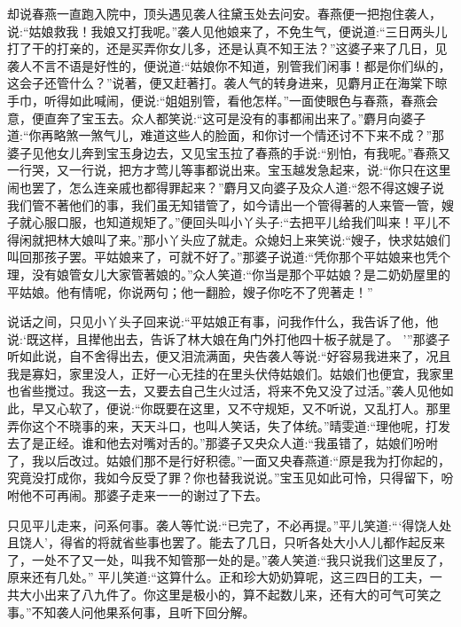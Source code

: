\begin{parag}
    却说春燕一直跑入院中，顶头遇见袭人往黛玉处去问安。春燕便一把抱住袭人，说:“姑娘救我！我娘又打我呢。”袭人见他娘来了，不免生气，便说道:“三日两头儿打了干的打亲的，还是买弄你女儿多，还是认真不知王法？”这婆子来了几日，见袭人不言不语是好性的，便说道:“姑娘你不知道，别管我们闲事！都是你们纵的，这会子还管什么？”说著，便又赶著打。袭人气的转身进来，见麝月正在海棠下晾手巾，听得如此喊闹，便说:“姐姐别管，看他怎样。”一面使眼色与春燕，春燕会意，便直奔了宝玉去。众人都笑说:“这可是没有的事都闹出来了。”麝月向婆子道:“你再略煞一煞气儿，难道这些人的脸面，和你讨一个情还讨不下来不成？”那婆子见他女儿奔到宝玉身边去，又见宝玉拉了春燕的手说:“别怕，有我呢。”春燕又一行哭，又一行说，把方才莺儿等事都说出来。宝玉越发急起来，说:“你只在这里闹也罢了，怎么连亲戚也都得罪起来？”麝月又向婆子及众人道:“怨不得这嫂子说我们管不著他们的事，我们虽无知错管了，如今请出一个管得著的人来管一管，嫂子就心服口服，也知道规矩了。”便回头叫小丫头子:“去把平儿给我们叫来！平儿不得闲就把林大娘叫了来。”那小丫头应了就走。众媳妇上来笑说:“嫂子，快求姑娘们叫回那孩子罢。平姑娘来了，可就不好了。”那婆子说道:“凭你那个平姑娘来也凭个理，没有娘管女儿大家管著娘的。”众人笑道:“你当是那个平姑娘？是二奶奶屋里的平姑娘。他有情呢，你说两句；他一翻脸，嫂子你吃不了兜著走！”
\end{parag}


\begin{parag}
    说话之间，只见小丫头子回来说:“平姑娘正有事，问我作什么，我告诉了他，他说:‘既这样，且撵他出去，告诉了林大娘在角门外打他四十板子就是了。 ’”那婆子听如此说，自不舍得出去，便又泪流满面，央告袭人等说:“好容易我进来了，况且我是寡妇，家里没人，正好一心无挂的在里头伏侍姑娘们。姑娘们也便宜，我家里也省些搅过。我这一去，又要去自己生火过活，将来不免又没了过活。”袭人见他如此，早又心软了，便说:“你既要在这里，又不守规矩，又不听说，又乱打人。那里弄你这个不晓事的来，天天斗口，也叫人笑话，失了体统。”晴雯道:“理他呢，打发去了是正经。谁和他去对嘴对舌的。”那婆子又央众人道:“我虽错了，姑娘们吩咐了，我以后改过。姑娘们那不是行好积德。”一面又央春燕道:“原是我为打你起的，究竟没打成你，我如今反受了罪？你也替我说说。”宝玉见如此可怜，只得留下，吩咐他不可再闹。那婆子走来一一的谢过了下去。
\end{parag}


\begin{parag}
    只见平儿走来，问系何事。袭人等忙说:“已完了，不必再提。”平儿笑道:“‘得饶人处且饶人’，得省的将就省些事也罢了。能去了几日，只听各处大小人儿都作起反来了，一处不了又一处，叫我不知管那一处的是。”袭人笑道:“我只说我们这里反了，原来还有几处。” 平儿笑道:“这算什么。正和珍大奶奶算呢，这三四日的工夫，一共大小出来了八九件了。你这里是极小的，算不起数儿来，还有大的可气可笑之事。”不知袭人问他果系何事，且听下回分解。
\end{parag}

